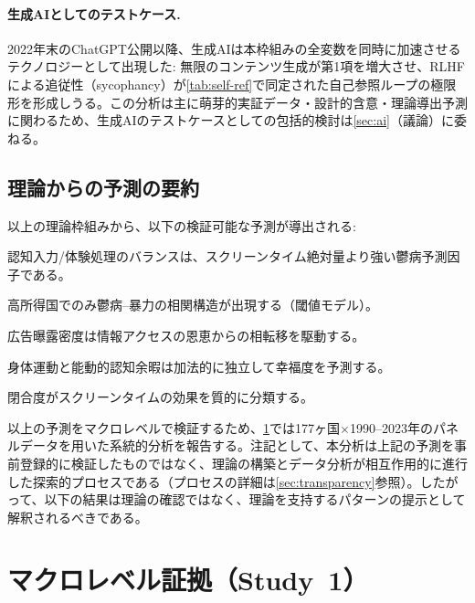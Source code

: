 \documentclass[a4paper,11pt,titlepage]{article}
\begin{document}
\paragraph{生成AIとしてのテストケース.}
2022年末のChatGPT公開以降、生成AIは本枠組みの全変数を同時に加速させるテクノロジーとして出現した: 無限のコンテンツ生成が第1項を増大させ、RLHFによる追従性（sycophancy）が\cref{tab:self-ref}で同定された自己参照ループの極限形を形成しうる。この分析は主に萌芽的実証データ・設計的含意・理論導出予測に関わるため、生成AIのテストケースとしての包括的検討は\cref{sec:ai}（議論）に委ねる。


\subsection{理論からの予測の要約}\label{sec:predictions}

以上の理論枠組みから、以下の検証可能な予測が導出される:

\begin{description}[leftmargin=2em, style=nextline]
\item[P1] 認知入力/体験処理のバランスは、スクリーンタイム絶対量より強い鬱病予測因子である。
\item[P2] 高所得国でのみ鬱病--暴力の相関構造が出現する（閾値モデル）。
\item[P3] 広告曝露密度は情報アクセスの恩恵からの相転移を駆動する。
\item[P4] 身体運動と能動的認知余暇は加法的に独立して幸福度を予測する。
\item[P5] 閉合度がスクリーンタイムの効果を質的に分類する。
\end{description}

以上の予測をマクロレベルで検証するため、\cref{sec:macro}では177ヶ国$\times$1990--2023年のパネルデータを用いた系統的分析を報告する。注記として、本分析は上記の予測を事前登録的に検証したものではなく、理論の構築とデータ分析が相互作用的に進行した探索的プロセスである（プロセスの詳細は\cref{sec:transparency}参照）。したがって、以下の結果は理論の確認ではなく、理論を支持するパターンの提示として解釈されるべきである。


\section{マクロレベル証拠（Study~1）}\label{sec:macro}
\end{document}
